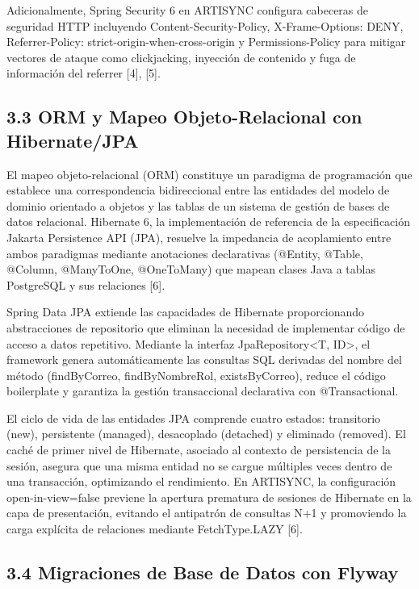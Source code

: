 \documentclass[
]{article}
\begin{document}
Adicionalmente, Spring Security 6 en ARTISYNC configura cabeceras de
seguridad HTTP incluyendo Content-Security-Policy, X-Frame-Options:
DENY, Referrer-Policy: strict-origin-when-cross-origin y
Permissions-Policy para mitigar vectores de ataque como clickjacking,
inyección de contenido y fuga de información del referrer {[}4{]},
{[}5{]}.

\subsection{3.3 ORM y Mapeo Objeto-Relacional con
Hibernate/JPA}

El mapeo objeto-relacional (ORM) constituye un paradigma de programación
que establece una correspondencia bidireccional entre las entidades del
modelo de dominio orientado a objetos y las tablas de un sistema de
gestión de bases de datos relacional. Hibernate 6, la implementación de
referencia de la especificación Jakarta Persistence API (JPA), resuelve
la impedancia de acoplamiento entre ambos paradigmas mediante
anotaciones declarativas (@Entity, @Table, @Column, @ManyToOne,
@OneToMany) que mapean clases Java a tablas PostgreSQL y sus relaciones
{[}6{]}.

Spring Data JPA extiende las capacidades de Hibernate proporcionando
abstracciones de repositorio que eliminan la necesidad de implementar
código de acceso a datos repetitivo. Mediante la interfaz
JpaRepository\textless T, ID\textgreater, el framework genera
automáticamente las consultas SQL derivadas del nombre del método
(findByCorreo, findByNombreRol, existsByCorreo), reduce el código
boilerplate y garantiza la gestión transaccional declarativa con
@Transactional.

El ciclo de vida de las entidades JPA comprende cuatro estados:
transitorio (new), persistente (managed), desacoplado (detached) y
eliminado (removed). El caché de primer nivel de Hibernate, asociado al
contexto de persistencia de la sesión, asegura que una misma entidad no
se cargue múltiples veces dentro de una transacción, optimizando el
rendimiento. En ARTISYNC, la configuración open-in-view=false previene
la apertura prematura de sesiones de Hibernate en la capa de
presentación, evitando el antipatrón de consultas N+1 y promoviendo la
carga explícita de relaciones mediante FetchType.LAZY {[}6{]}.

\subsection{3.4 Migraciones de Base de Datos con
Flyway}
\end{document}
